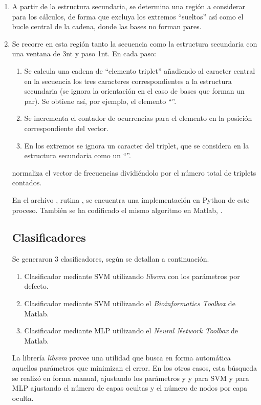 \begin{enumerate}
\item A partir de la estructura secundaria, se determina una región a
  considerar para los cálculos, de forma que excluya los extremos
  ``sueltos'' así como el bucle central de la cadena, donde las bases
  no forman pares.
\item Se recorre en esta región tanto la secuencia como la
  estructura secundaria con una ventana de 3nt y paso 1nt. En cada
  paso:
  \begin{enumerate}
  \item Se calcula una cadena de ``elemento triplet'' añadiendo al
    caracter central en la secuencia los tres caracteres
    correspondientes a la estructura secundaria (se ignora la
    orientación en el caso de bases que forman un par). Se obtiene
    así, por ejemplo, el elemento ``''.
  \item Se incrementa el contador de ocurrencias para el elemento en
    la posición correspondiente del vector.
  \item En los extremos se ignora un caracter del triplet, que se
    considera en la estructura secundaria como un ``''.
  \end{enumerate}
\itemSe normaliza el vector de frecuencias dividiéndolo por el número
  total de triplets contados.

En el archivo , rutina , se encuentra
una implementación en Python de este proceso. También se ha codificado
el mismo algoritmo en Matlab, .

\subsection{Clasificadores}
Se generaron 3 clasificadores, según se detallan a continuación.

\begin{enumerate}
\item Clasificador mediante SVM utilizando \emph{libsvm}\cite{libsvm} con los
  parámetros por defecto.
\item Clasificador mediante SVM utilizando el \emph{Bioinformatics
  Toolbox} de Matlab.
\item Clasificador mediante MLP utilizando el \emph{Neural Network
  Toolbox} de Matlab.
\end{enumerate}
La librería \emph{libsvm}\cite{libsvm} provee una utilidad  que
busca en forma automática aquellos parámetros que minimizan el
error. En los otros casos, esta búsqueda se realizó en forma manual,
ajustando los parámetros  y y  para
SVM y para MLP ajustando el número de capas ocultas y el número de
nodos por capa oculta.


\end{enumerate}
